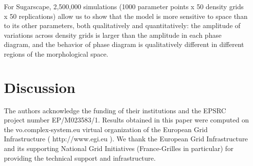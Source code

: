\documentclass[Afour,sageh,times]{sagej}
\begin{document}
For Sugarscape, 2,500,000 simulations (1000 parameter points x 50 density grids x 50 replications) allow us to show that the model is more sensitive to space than to its other parameters, both qualitatively and quantitatively: the amplitude of variations across density grids is larger than the amplitude in each phase diagram, and the behavior of phase diagram is qualitatively different in different regions of the morphological space.



\section{Discussion}





%
%
%
%
%
%


\begin{acks}
The authors acknowledge the funding of their institutions and the EPSRC project number EP/M023583/1. Results obtained in this paper were computed on the vo.complex-system.eu virtual organization of the European Grid Infrastructure ( http://www.egi.eu ). We thank the European Grid Infrastructure and its supporting National Grid Initiatives (France-Grilles in particular) for providing the technical support and infrastructure.
\end{acks}








\end{document}

